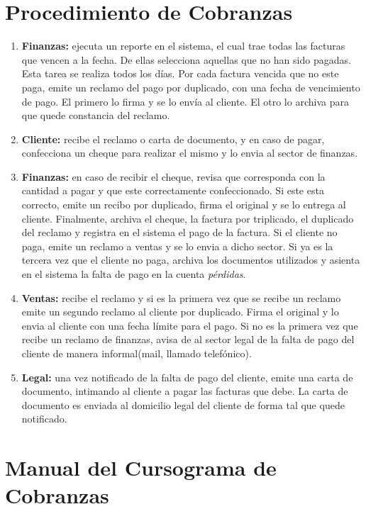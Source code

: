 \section{Procedimiento de Cobranzas}
\begin{enumerate}
  \item \textbf{Finanzas:} ejecuta un reporte en el sistema, el cual trae todas las facturas que vencen a la fecha. De ellas selecciona aquellas que no han sido pagadas. Esta tarea se realiza todos los días.
  Por cada factura vencida que no este paga, emite un reclamo del pago por duplicado, con una fecha de vencimiento de pago. El primero lo firma y se lo envía al cliente. El otro lo archiva para que quede constancia del reclamo.
  \item \textbf{Cliente:} recibe el reclamo o carta de documento, y en caso de pagar, confecciona un cheque para realizar el mismo y lo envia al sector de finanzas.
  \item \textbf{Finanzas:} en caso de recibir el cheque, revisa que corresponda con la cantidad a pagar y que este correctamente confeccionado. Si este esta correcto, emite un recibo por duplicado, firma el original y se lo entrega al cliente. Finalmente, archiva el cheque, la factura por triplicado, el duplicado del reclamo y registra en el sistema el pago de la factura.
  Si el cliente no paga, emite un reclamo a ventas y se lo envia a dicho sector. Si ya es la tercera vez que el cliente no paga, archiva los documentos utilizados y asienta en el sistema la falta de pago en la cuenta \textit{pérdidas}.
  \item \textbf{Ventas:} recibe el reclamo y si es la primera vez que se recibe un reclamo emite un segundo reclamo al cliente por duplicado. Firma el original y lo envia al cliente con una fecha límite para el pago. Si no es la primera vez que recibe un reclamo de finanzas, avisa de al sector legal de la falta de pago del cliente de manera informal(mail, llamado telefónico).
  \item \textbf{Legal:} una vez notificado de la falta de pago del cliente, emite una carta de documento, intimando al cliente a pagar las facturas que debe. La carta de documento es enviada al domicilio legal del cliente de forma tal que quede notificado.
\end{enumerate}

\pagebreak
\section{Manual del Cursograma de Cobranzas}

